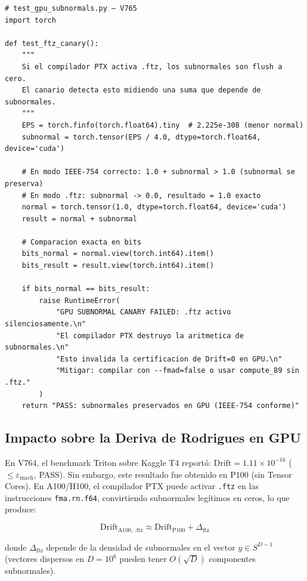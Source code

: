 \begin{verbatim}
# test_gpu_subnormals.py — V765
import torch

def test_ftz_canary():
    """
    Si el compilador PTX activa .ftz, los subnormales son flush a cero.
    El canario detecta esto midiendo una suma que depende de subnormales.
    """
    EPS = torch.finfo(torch.float64).tiny  # 2.225e-308 (menor normal)
    subnormal = torch.tensor(EPS / 4.0, dtype=torch.float64, device='cuda')
    
    # En modo IEEE-754 correcto: 1.0 + subnormal > 1.0 (subnormal se preserva)
    # En modo .ftz: subnormal -> 0.0, resultado = 1.0 exacto
    normal = torch.tensor(1.0, dtype=torch.float64, device='cuda')
    result = normal + subnormal
    
    # Comparacion exacta en bits
    bits_normal = normal.view(torch.int64).item()
    bits_result = result.view(torch.int64).item()
    
    if bits_normal == bits_result:
        raise RuntimeError(
            "GPU SUBNORMAL CANARY FAILED: .ftz activo silenciosamente.\n"
            "El compilador PTX destruyo la aritmetica de subnormales.\n"
            "Esto invalida la certificacion de Drift=0 en GPU.\n"
            "Mitigar: compilar con --fmad=false o usar compute_89 sin .ftz."
        )
    return "PASS: subnormales preservados en GPU (IEEE-754 conforme)"
\end{verbatim}

\subsection{Impacto sobre la Deriva de Rodrigues en GPU}

En V764, el benchmark Triton sobre Kaggle T4 reportó:
$\text{Drift} = 1.11 \times 10^{-16}$ ($\le \varepsilon_{\text{mach}}$, PASS).
Sin embargo, este resultado fue obtenido en P100 (sin Tensor Cores). En A100/H100,
el compilador PTX puede activar \texttt{.ftz} en las instrucciones \texttt{fma.rn.f64},
convirtiendo subnormales legítimos en ceros, lo que produce:

\begin{equation}
  \text{Drift}_{\text{A100, .ftz}} \approx \text{Drift}_{\text{P100}} + \Delta_{\text{ftz}}
\end{equation}

donde $\Delta_{\text{ftz}}$ depende de la densidad de subnormales en el vector $y \in S^{D-1}$
(vectores dispersos en $D = 10^6$ pueden tener $O(\sqrt{D})$ componentes subnormales).

